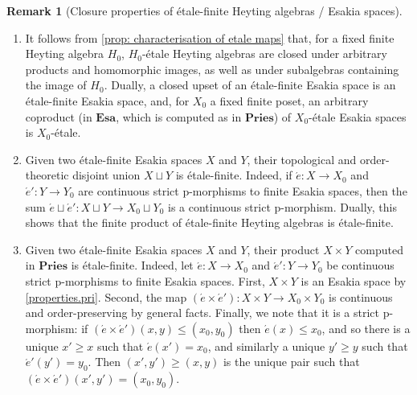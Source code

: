 \documentclass[12pt]{amsart}
\theoremstyle{plain}
\theoremstyle{definition}
\newtheorem{remark}[theorem]{Remark}
\newcommand{\cat}[1]{\mathbf{#1}}
\newcommand{\Esa}{\cat{Esa}}
\newcommand{\Pries}{\cat{Pries}}
\begin{document}
\begin{remark}[Closure properties of étale-finite Heyting algebras / Esakia spaces] \label{rem:closure-properties}
    \hfill
    \begin{enumerate}
        \item \label{eq: closure properties of etale-finite} 
        It follows from \cref{prop: characterisation of etale maps} that, for a fixed finite Heyting algebra $H_0$, $H_0$-étale Heyting algebras are closed under arbitrary products and homomorphic images, as well as under subalgebras containing the image of $H_0$.
        Dually, a closed upset of an étale-finite Esakia space is an étale-finite Esakia space, and, for $X_{0}$ a fixed finite poset, an arbitrary coproduct (in $\Esa$, which is computed as in $\Pries$) of $X_{0}$-étale Esakia spaces is $X_{0}$-étale. 

               
        \item Given two étale-finite Esakia spaces $X$ and $Y$, their topological and order-theoretic disjoint union $X\sqcup Y$ is étale-finite.
        Indeed, if $\acute{e}\colon X\to X_{0}$ and $\acute{e}'\colon Y\to Y_{0}$ are continuous strict p-morphisms to finite Esakia spaces, then the sum $\acute{e} \sqcup \acute{e}'\colon X\sqcup Y\to X_{0}\sqcup Y_{0}$ is a continuous strict p-morphism. Dually, this shows that the finite product of étale-finite Heyting algebras is étale-finite.
        
        \item 
        Given two étale-finite Esakia spaces $X$ and $Y$, their product $X \times Y$ computed in $\Pries$ is étale-finite.
        Indeed, let $\acute{e}\colon X\to X_{0}$ and $\acute{e}'\colon Y\to Y_{0}$ be continuous strict p-morphisms to finite Esakia spaces.
        First, $X\times Y$ is an Esakia space by \cref{properties.pri}. Second, the map $(\acute{e}\times \acute{e}')\colon X\times Y\to X_{0}\times Y_{0}$ is continuous and order-preserving by general facts. Finally, we note that it is a strict p-morphism: if $(\acute{e}\times \acute{e}')(x,y)\leq (x_{0},y_{0})$ then $\acute{e}(x)\leq x_{0}$, and so there is a unique $x'\geq x$ such that $\acute{e}(x')=x_{0}$, and similarly a unique $y'\geq y$ such that $\acute{e}'(y')=y_{0}$. Then $(x',y')\geq (x,y)$ is the unique pair such that $(\acute{e}\times \acute{e}')(x',y')=(x_{0},y_{0})$.

    \end{enumerate}
    
\end{remark}
\end{document}
